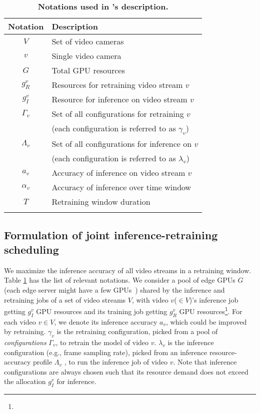 \begin{table}[t!]
\small
\begin{tabular}{cl}
{\bf Notation} & {\bf Description}\\\hline
$V$ & Set of video cameras\\
$v$ & Single video camera\\\hline
$G$ & Total GPU resources\\
$g^v_R$ & Resources for retraining video stream $v$\\
$g^v_I$ & Resource for inference on video stream $v$\\\hline
$\Gamma_v$ & Set of all configurations for retraining $v$\\
 & (each configuration is referred to as $\gamma_v$)\\
$\Lambda_v$ & Set of all configurations for inference on $v$\\
 & (each configuration is referred to as $\lambda_v$)\\\hline
$a_v$ & Accuracy of inference on video stream $v$\\
$\alpha_v$ & Accuracy of inference over time window\\
$T$ & Retraining window duration\\\hline\\
\end{tabular}
\caption{\label{tab:notations}\small\bf Notations used in {\name}'s description.}
\end{table}

\subsection{\hspace{-0.2cm}Formulation of joint inference-retraining scheduling}
\label{subsec:formulation}
We maximize the inference accuracy of all video streams in a retraining window. Table \ref{tab:notations} has the list of relevant notations.
We consider a pool of edge GPUs $G$ (each edge server might have a few GPUs~\cite{azure-ase}) shared by the inference and retraining jobs of a set of video streams $V$, with video $v$($\in V$)'s inference job getting $g^{v}_I$ GPU resources and its training job getting $g^{v}_R$ GPU resources\footnote{}. 
For each video $v \in V$, we denote its inference accuracy $a_v$, which could be improved by retraining.
$\gamma_v$ is the retraining configuration, picked from a pool of \textit{configurations} $\Gamma_v$, to retrain the model of video $v$.
$\lambda_v$ is the inference configuration (e.g., frame sampling rate), picked from an inference resource-accuracy profile $\Lambda_v$ \cite{videostorm, chameleon}, to run the inference job of video $v$.
Note that inference configurations are always chosen such that its resource demand does not exceed the allocation $g^v_I$ for inference.

